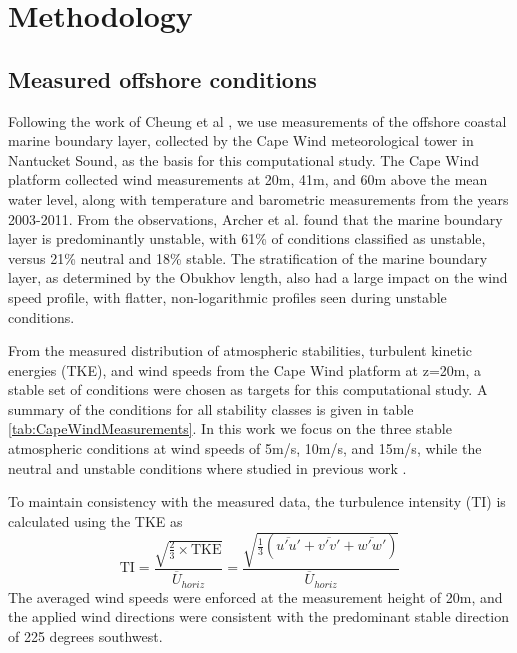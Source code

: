 \section{Methodology}

\subsection{Measured offshore conditions}

Following the work of Cheung et al \cite{cheung2020large}, we use
measurements of the offshore coastal marine boundary layer, collected
by the Cape Wind meteorological tower in Nantucket Sound, as the basis
for this computational study.  The Cape Wind platform collected wind
measurements at 20m, 41m, and 60m above the mean water level, along
with temperature and barometric measurements from the years 2003-2011.
From the observations, Archer et al.\cite{archer2016predominance}
found that the marine boundary layer is predominantly unstable, with
61\% of conditions classified as unstable, versus 21\% neutral and
18\% stable.  The stratification of the marine boundary layer, as
determined by the Obukhov length, also had a large impact on the wind
speed profile, with flatter, non-logarithmic profiles seen during
unstable conditions.

From the measured distribution of atmospheric stabilities, turbulent
kinetic energies (TKE), and wind speeds from the Cape Wind platform at
z=20m, a stable set of conditions were chosen as targets for this
computational study.  A summary of the conditions for all stability
classes is given in table \ref{tab:CapeWindMeasurements}. In this work we
focus on the three stable atmospheric conditions at wind speeds of
5m/s, 10m/s, and 15m/s, while the neutral and unstable conditions
where studied in previous work \cite{cheung2020large}.

To maintain consistency with the measured data, the turbulence
intensity (TI) is calculated using the TKE as
\begin{equation}
  \textrm{TI} =
  \frac{\sqrt{\frac{2}{3}\times\textrm{TKE}}}{\overline{U}_{horiz}} =
  \frac{\sqrt{\frac{1}{3}\left( \overline{u'u'} + \overline{v'v'} + \overline{w'w'}
      \right)}}{\overline{U}_{horiz}}
\end{equation}
The averaged wind speeds were enforced at the measurement height of
20m, and the applied wind directions were consistent with the
predominant stable direction of 225 degrees southwest.

